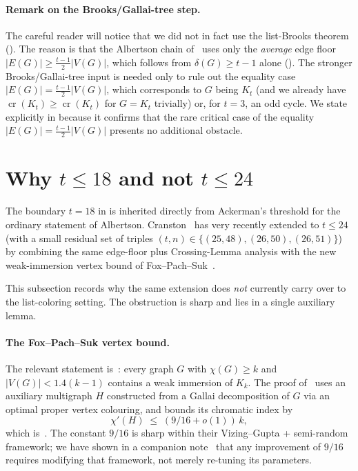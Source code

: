 \documentclass[11pt,a4paper]{article}
\theoremstyle{definition}
\DeclareMathOperator{\crN}{cr}
\begin{document}
\paragraph{Remark on the Brooks/Gallai-tree step.}
The careful reader will notice that we did not in fact use the
list-Brooks theorem (). The reason is that
the Albertson chain of~\cite{ACF, BT, Ackerman} uses only the
\emph{average} edge floor $|E(G)| \ge \tfrac{t-1}{2}|V(G)|$, which
follows from $\delta(G) \ge t - 1$ alone ().
The stronger Brooks/Gallai-tree input is needed only to rule out
the equality case $|E(G)| = \tfrac{t-1}{2}|V(G)|$, which corresponds
to $G$ being $K_t$ (and we already have $\crN(K_t) \ge \crN(K_t)$
for $G = K_t$ trivially) or, for $t = 3$, an odd cycle.
We state  explicitly in
 because it confirms that the rare critical case
of the equality $|E(G)| = \tfrac{t-1}{2}|V(G)|$ presents no
additional obstacle.

\section{Why \texorpdfstring{$t \le 18$}{t <= 18} and not
         \texorpdfstring{$t \le 24$}{t <= 24}}\label{sec:boundary}

The boundary $t = 18$ in  is inherited directly
from Ackerman's threshold for the ordinary statement of Albertson.
Cranston~\cite{Cranston} has very recently extended
 to $t \le 24$ (with a small residual set of
triples $(t, n) \in \{(25, 48), (26, 50), (26, 51)\}$) by combining
the same edge-floor plus Crossing-Lemma analysis with the new
weak-immersion vertex bound of Fox--Pach--Suk~\cite[Theorem~1.2(i)]{FPS}.

This subsection records why the same extension does \emph{not}
currently carry over to the list-coloring setting. The
obstruction is sharp and lies in a single auxiliary lemma.

\paragraph{The Fox--Pach--Suk vertex bound.}
The relevant statement is~\cite[Theorem~1.2(i)]{FPS}: every graph
$G$ with $\chi(G) \ge k$ and $|V(G)| < 1.4(k - 1)$ contains a
weak immersion of $K_k$. The proof of~\cite[Theorem~1.2(i)]{FPS}
uses an auxiliary multigraph $H$ constructed from a Gallai
decomposition of $G$ via an optimal proper vertex colouring, and
bounds its chromatic index by
\begin{equation}\label{eq:fps23}
   \chi'(H) \;\le\; (9/16 + o(1))\,k,
\end{equation}
which is~\cite[Lemma~2.3]{FPS}. The constant $9/16$
is sharp within their Vizing--Gupta + semi-random framework; we
have shown in a companion note~\cite{D8} that any
improvement of $9/16$ requires modifying that framework, not merely
re-tuning its parameters.
\end{document}

